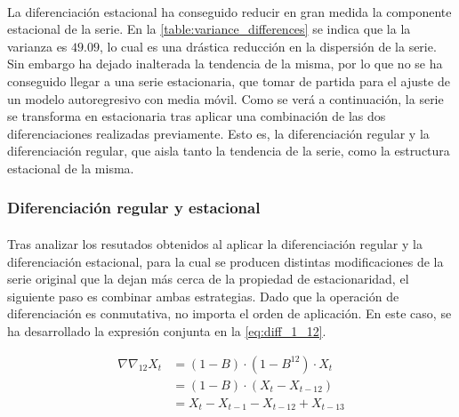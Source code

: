 \documentclass[a4paper, spanish]{article}
\begin{document}
        \paragraph{}
        La diferenciación estacional ha conseguido reducir en gran medida la componente estacional de la serie. En la \autoref{table:variance_differences} se indica que la la varianza es $49.09$, lo cual es una drástica reducción en la dispersión de la serie. Sin embargo ha dejado inalterada la tendencia de la misma, por lo que no se ha conseguido llegar a una serie estacionaria, que tomar de partida para el ajuste de un modelo autoregresivo con media móvil. Como se verá a continuación, la serie se transforma en estacionaria tras aplicar una combinación de las dos diferenciaciones realizadas previamente. Esto es, la diferenciación regular y la diferenciación regular, que aisla tanto la tendencia de la serie, como la estructura estacional de la misma.

      \subsubsection{Diferenciación regular y estacional}
      \label{sec:regular_seasonal_difference}

        \paragraph{}
        Tras analizar los resutados obtenidos al aplicar la diferenciación regular y la diferenciación estacional, para la cual se producen distintas modificaciones de la serie original que la dejan más cerca de la propiedad de estacionaridad, el siguiente paso es combinar ambas estrategias. Dado que la operación de diferenciación es conmutativa, no importa el orden de aplicación. En este caso, se ha desarrollado la expresión conjunta en la \autoref{eq:diff_1_12}.

        \begin{equation}
        \label{eq:diff_1_12}
          \begin{split}
            \nabla \nabla_{12} X_t
            &= (1 - B) \cdot (1 - B^{12}) \cdot X_t \\
            &= (1 - B) \cdot (X_t - X_{t - 12}) \\
            &= X_t - X_{t - 1} - X_{t - 12} + X_{t - 13}
          \end{split}
        \end{equation}
\end{document}
